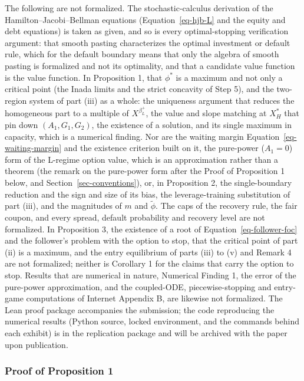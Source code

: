 \documentclass[
  11pt,
  letterpaper,
]{scrartcl}
\begin{document}
The following are not formalized. The stochastic-calculus derivation of
the Hamilton--Jacobi--Bellman equations (Equation~\ref{eq-hjb-L} and the
equity and debt equations) is taken as given, and so is every
optimal-stopping verification argument: that smooth pasting
characterizes the optimal investment or default rule, which for the
default boundary means that only the algebra of smooth pasting is
formalized and not its optimality, and that a candidate value function
is the value function. In Proposition 1, that \(\phi^*\) is a maximum
and not only a critical point (the Inada limits and the strict concavity
of Step 5), and the two-region system of part (iii) as a whole: the
uniqueness argument that reduces the homogeneous part to a multiple of
\(X^{\beta_L^+}\), the value and slope matching at \(X_H^*\) that pin
down \((A_1, G_1, G_2)\), the existence of a solution, and its single
maximum in capacity, which is a numerical finding. Nor are the waiting
margin Equation~\ref{eq-waiting-margin} and the existence criterion
built on it, the pure-power (\(A_1 = 0\)) form of the L-regime option
value, which is an approximation rather than a theorem (the remark on
the pure-power form after the Proof of Proposition 1 below, and
Section~\ref{sec-conventions}), or, in Proposition 2, the
single-boundary reduction and the sign and size of its bias, the
leverage-training substitution of part (iii), and the magnitudes of
\(m\) and \(\tilde{\phi}\). The caps of the recovery rule, the fair
coupon, and every spread, default probability and recovery level are not
formalized. In Proposition 3, the existence of a root of
Equation~\ref{eq-follower-foc} and the follower's problem with the
option to stop, that the critical point of part (ii) is a maximum, and
the entry equilibrium of parts (iii) to (v) and Remark 4 are not
formalized; neither is Corollary 1 for the claims that carry the option
to stop. Results that are numerical in nature, Numerical Finding 1, the
error of the pure-power approximation, and the coupled-ODE,
piecewise-stopping and entry-game computations of Internet Appendix B,
are likewise not formalized. The Lean proof package accompanies the
submission; the code reproducing the numerical results (Python source,
locked environment, and the commands behind each exhibit) is in the
replication package and will be archived with the paper upon
publication.

\subsubsection*{Proof of Proposition 1}\label{proof-of-proposition-1}
\end{document}

